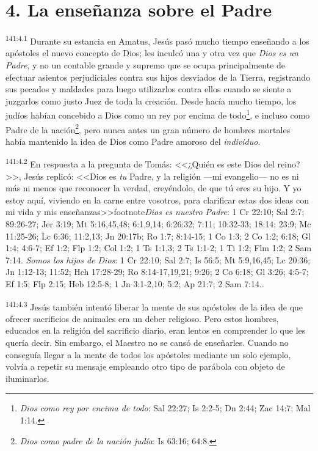 \section*{4. La enseñanza sobre el Padre}
\par 
\textsuperscript{141:4.1} Durante su estancia en Amatus, Jesús pasó mucho tiempo enseñando a los apóstoles el nuevo concepto de Dios; les inculcó una y otra vez que \textit{Dios es un Padre}, y no un contable grande y supremo que se ocupa principalmente de efectuar asientos perjudiciales contra sus hijos desviados de la Tierra, registrando sus pecados y maldades para luego utilizarlos contra ellos cuando se siente a juzgarlos como justo Juez de toda la creación. Desde hacía mucho tiempo, los judíos habían concebido a Dios como un rey por encima de todo\footnote{\textit{Dios como rey por encima de todo}: Sal 22:27; Is 2:2-5; Dn 2:44; Zac 14:7; Mal 1:14.}, e incluso como Padre de la nación\footnote{\textit{Dios como padre de la nación judía}: Is 63:16; 64:8.}, pero nunca antes un gran número de hombres mortales había mantenido la idea de Dios como Padre amoroso del \textit{individuo}.

\par 
\textsuperscript{141:4.2} En respuesta a la pregunta de Tomás: <<¿Quién es este Dios del reino?>>, Jesús replicó: <<Dios es \textit{tu} Padre, y la religión ---mi evangelio--- no es ni más ni menos que reconocer la verdad, creyéndolo, de que tú eres su hijo. Y yo estoy aquí, viviendo en la carne entre vosotros, para clarificar estas dos ideas con mi vida y mis enseñanzas>>footnote{\textit{Dios es nuestro Padre}: 1 Cr 22:10; Sal 2:7; 89:26-27; Jer 3:19; Mt 5:16,45,48; 6:1,9,14; 6:26:32; 7:11; 10:32-33; 18:14; 23:9; Mc 11:25-26; Lc 6:36; 11:2,13; Jn 20:17b; Ro 1:7; 8:14-15; 1 Co 1:3; 2 Co 1:2; 6:18; Gl 1:4; 4:6-7; Ef 1:2; Flp 1:2; Col 1:2; 1 Ts 1:1,3; 2 Ts 1:1-2; 1 Ti 1:2; Flm 1:2; 2 Sam 7:14. \textit{Somos los hijos de Dios}: 1 Cr 22:10; Sal 2:7; Is 56:5; Mt 5:9,16,45; Lc 20:36; Jn 1:12-13; 11:52; Hch 17:28-29; Ro 8:14-17,19,21; 9:26; 2 Co 6:18; Gl 3:26; 4:5-7; Ef 1:5; Flp 2:15; Heb 12:5-8; 1 Jn 3:1-2,10; 5:2; Ap 21:7; 2 Sam 7:14.}.

\par 
\textsuperscript{141:4.3} Jesús también intentó liberar la mente de sus apóstoles de la idea de que ofrecer sacrificios de animales era un deber religioso. Pero estos hombres, educados en la religión del sacrificio diario, eran lentos en comprender lo que les quería decir. Sin embargo, el Maestro no se cansó de enseñarles. Cuando no conseguía llegar a la mente de todos los apóstoles mediante un solo ejemplo, volvía a repetir su mensaje empleando otro tipo de parábola con objeto de iluminarlos.

